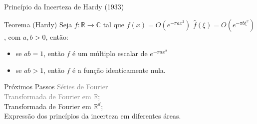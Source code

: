 \documentclass{beamer}
\begin{document}
\begin{frame}{Princípio da Incerteza de Hardy (1933)}
    \begin{block}{Teorema (Hardy)}
        Seja $f: \mathbb{R} \rightarrow\mathbb{C}$ tal que
        $f(x)=O(e^{-\pi ax^2})$  $\hat{f}(\xi)=O(e^{-\pi b \xi^2})$, com $a,b > 0 $, então:
        \begin{itemize}
            \item se $ab=1$, então $f$ é um múltiplo escalar de $e^{- \pi a x^2}$
            \item se $ab >1$, então $f$ é a função identicamente nula.
        \end{itemize}
    \end{block}
\end{frame}

\begin{frame}{Próximos Passos}
\textcolor{gray}{Séries de Fourier}\\
\textcolor{gray}{Transformada de Fourier em $\mathbb{R}$};\\
Transformada de Fourier em $\mathbb{R}^d$;\\
Expressão dos princípios da incerteza em diferentes áreas.

    
\end{frame}
\end{document}
